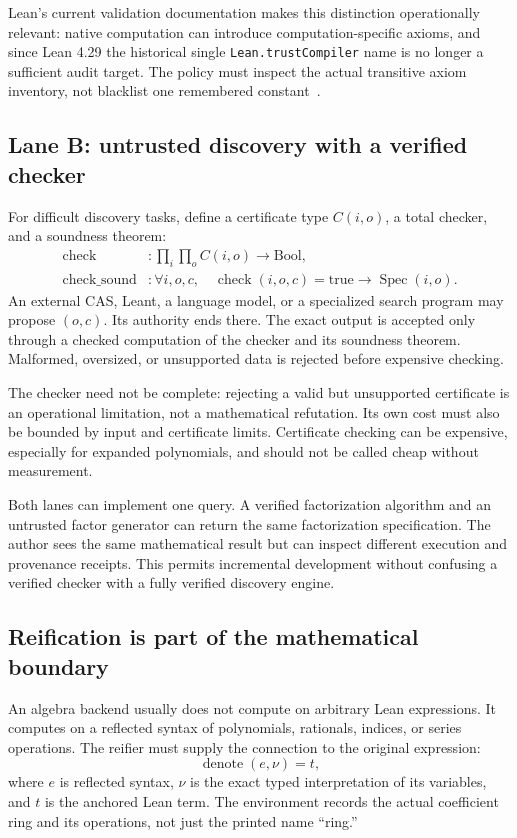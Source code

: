 \documentclass[11pt,a4paper]{article}
\newcommand{\code}[1]{\nolinkurl{#1}}
\newcommand{\Spec}{\operatorname{Spec}}
\newcommand{\CertCheck}{\operatorname{check}}
\theoremstyle{definition}
\begin{document}
Lean's current validation documentation makes this distinction operationally
relevant: native computation can introduce computation-specific axioms, and
since Lean 4.29 the historical single \code{Lean.trustCompiler} name is no longer
a sufficient audit target. The policy must inspect the actual transitive axiom
inventory, not blacklist one remembered constant~\cite{lean-validation}.

\subsection{Lane B: untrusted discovery with a verified checker}
For difficult discovery tasks, define a certificate type \(C(i,o)\), a total
checker, and a soundness theorem:
\begin{align*}
 \CertCheck &: \prod_i\prod_o C(i,o)\to\mathrm{Bool},\\
 \operatorname{check\_sound} &: \forall i,o,c,\quad
 \CertCheck(i,o,c)=\mathrm{true}\to\Spec(i,o).
\end{align*}
An external CAS, Leant, a language model, or a specialized search program may
propose \((o,c)\). Its authority ends there. The exact output is accepted only
through a checked computation of the checker and its soundness theorem.
Malformed, oversized, or unsupported data is rejected before expensive checking.

The checker need not be complete: rejecting a valid but unsupported certificate
is an operational limitation, not a mathematical refutation. Its own cost must
also be bounded by input and certificate limits. Certificate checking can be
expensive, especially for expanded polynomials, and should not be called cheap
without measurement.

Both lanes can implement one query. A verified factorization algorithm and an
untrusted factor generator can return the same factorization specification.
The author sees the same mathematical result but can inspect different execution
and provenance receipts. This permits incremental development without confusing
a verified checker with a fully verified discovery engine.

\subsection{Reification is part of the mathematical boundary}
An algebra backend usually does not compute on arbitrary Lean expressions. It
computes on a reflected syntax of polynomials, rationals, indices, or series
operations. The reifier must supply the connection to the original expression:
\[
 \operatorname{denote}(e,\nu)=t,
\]
where \(e\) is reflected syntax, \(\nu\) is the exact typed interpretation of its
variables, and \(t\) is the anchored Lean term. The environment records the actual
coefficient ring and its operations, not just the printed name ``ring.''
\end{document}
